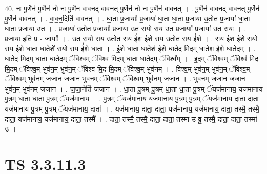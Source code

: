 \documentclass[17pt]{extarticle}
\begin{document}
40. नः॒ पू॒र्णेन॑ पू॒र्णेन॑ नो नः पू॒र्णेन॑ वावनद् वावनत् पू॒र्णेन॑ नो नः पू॒र्णेन॑ वावनत् । . पू॒र्णेन॑ वावनद् वावनत् पू॒र्णेन॑ पू॒र्णेन॑ वावनत् । . वा॒व॒न॒दिति॑ वावनत् । . धा॒ता प्र॒जायाः᳚ प्र॒जाया॑ धा॒ता धा॒ता प्र॒जाया॑ उ॒तोत प्र॒जाया॑ धा॒ता धा॒ता प्र॒जाया॑ उ॒त । . प्र॒जाया॑ उ॒तोत प्र॒जायाः᳚ प्र॒जाया॑ उ॒त रा॒यो रा॒य उ॒त प्र॒जायाः᳚ प्र॒जाया॑ उ॒त रा॒यः । . प्र॒जाया॒ इति॑ प्र - जायाः᳚ । . उ॒त रा॒यो रा॒य उ॒तोत रा॒य ई॑श ईशे रा॒य उ॒तोत रा॒य ई॑शे । . रा॒य ई॑श ईशे रा॒यो रा॒य ई॑शे धा॒ता धा॒तेशे॑ रा॒यो रा॒य ई॑शे धा॒ता । . ई॒शे॒ धा॒ता धा॒तेश॑ ईशे धा॒तेद मि॒दम् धा॒तेश॑ ईशे धा॒तेदम् । . धा॒तेद मि॒दम् धा॒ता धा॒तेदम् ॅविश्व॒म् ॅविश्व॑ मि॒दम् धा॒ता धा॒तेदम् ॅविश्व᳚म् । . इ॒दम् ॅविश्व॒म् ॅविश्व॑ मि॒द मि॒दम् ॅविश्व॒म् भुव॑न॒म् भुव॑न॒म् ॅविश्व॑ मि॒द मि॒दम् ॅविश्व॒म् भुव॑नम् । . विश्व॒म् भुव॑न॒म् भुव॑न॒म् ॅविश्व॒म् ॅविश्व॒म् भुव॑नम् जजान जजान॒ भुव॑न॒म् ॅविश्व॒म् ॅविश्व॒म् भुव॑नम् जजान । . भुव॑नम् जजान जजान॒ भुव॑न॒म् भुव॑नम् जजान । . ज॒जा॒नेति॑ जजान । . धा॒ता पु॒त्रम् पु॒त्रम् धा॒ता धा॒ता पु॒त्रम् ॅयज॑मानाय॒ यज॑मानाय पु॒त्रम् धा॒ता धा॒ता पु॒त्रम् ॅयज॑मानाय । . पु॒त्रम् ॅयज॑मानाय॒ यज॑मानाय पु॒त्रम् पु॒त्रम् ॅयज॑मानाय॒ दाता॒ दाता॒ यज॑मानाय पु॒त्रम् पु॒त्रम् ॅयज॑मानाय॒ दाता᳚ । . यज॑मानाय॒ दाता॒ दाता॒ यज॑मानाय॒ यज॑मानाय॒ दाता॒ तस्मै॒ तस्मै॒ दाता॒ यज॑मानाय॒ यज॑मानाय॒ दाता॒ तस्मै᳚ । . दाता॒ तस्मै॒ तस्मै॒ दाता॒ दाता॒ तस्मा॑ उ वु॒ तस्मै॒ दाता॒ दाता॒ तस्मा॑ उ । \newline
\pagebreak
{}

\section{ TS 3.3.11.3 }
\end{document}
